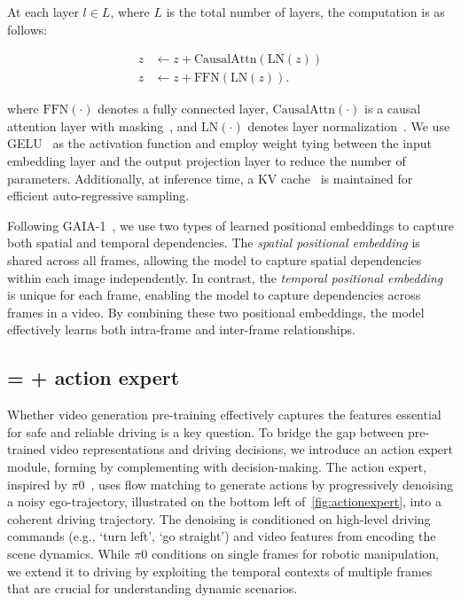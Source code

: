 At each layer $l \in L$, where $L$ is the total number of layers, the computation is as follows:

\begin{align}
z & \leftarrow z + \text{CausalAttn}(\text{LN}(z))  \\ 
z & \leftarrow z + \text{FFN}(\text{LN}(z)).    
\end{align}



where \( \text{FFN}(\cdot) \) denotes a fully connected layer, \( \text{CausalAttn}(\cdot) \) is a causal attention layer with masking~\cite{waswani2017attention}, and \( \text{LN}(\cdot) \) denotes layer normalization~\cite{lei2016layer}.
We use GELU~\cite{hendrycks2016gaussian} as the activation function and employ weight tying between the input embedding layer and the output projection layer to reduce the number of parameters. Additionally, at inference time, a KV cache~\cite{ott2019fairseq} is maintained for efficient auto-regressive sampling.

Following GAIA-1~\cite{hu2023gaia1}, we use two types of learned positional embeddings to capture both spatial and temporal dependencies. The \emph{spatial positional embedding}  is shared across all frames, allowing the model to capture spatial dependencies within each image independently. In contrast, the \emph{temporal positional embedding} is unique for each frame, enabling the model to capture dependencies across frames in a video. By combining these two positional embeddings, the model effectively learns both intra-frame and inter-frame relationships.

\subsection{\vam{} = \vm{} + action expert}
\label{sec:model:vam}

Whether video generation pre-training effectively captures the features essential for safe and reliable driving is a key question. To bridge the gap between pre-trained video representations and driving decisions, we introduce an action expert module, forming \vam{} by complementing \vm{} with decision-making.
%
The action expert, inspired by $\pi0$~\cite{black2024pi0}, uses flow matching to generate actions by progressively denoising a noisy ego-trajectory, illustrated on the bottom left of~\autoref{fig:actionexpert}, into a coherent driving trajectory. The denoising is conditioned on high-level driving commands (e.g., `turn left', `go straight') and video features from \vm{} encoding the scene dynamics.
%
While $\pi0$ conditions on single frames for robotic manipulation, we extend it to driving by exploiting the temporal contexts of multiple frames that are crucial for understanding dynamic scenarios.

